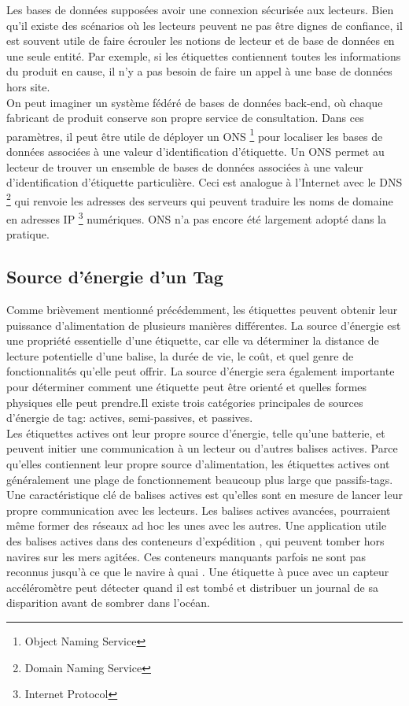 \documentclass[11pt, a4paper, twoside]{book}
\begin{document}
Les bases de données supposées avoir une connexion sécurisée aux lecteurs. Bien qu'il existe des scénarios où les lecteurs peuvent ne pas être dignes de confiance, il est souvent utile de faire écrouler les notions de lecteur et de base de données en une seule entité. Par exemple, si les étiquettes contiennent toutes les informations du produit en cause, il n'y a pas besoin de faire un appel à une base de données hors site.\\

On peut imaginer un système fédéré de bases de données back-end, où chaque fabricant de produit conserve son propre service de consultation. Dans ces paramètres, il peut être utile de déployer un ONS \footnote{Object Naming Service} pour localiser les bases de données associées à une valeur d'identification d'étiquette. Un ONS permet au lecteur de trouver un ensemble de bases de données associées à une valeur d'identification d'étiquette particulière. Ceci est analogue à l'Internet avec le DNS \footnote{Domain Naming Service} qui renvoie les adresses des serveurs qui peuvent traduire les noms de domaine en adresses IP \footnote{Internet Protocol} numériques. ONS n'a pas encore été largement adopté dans la pratique.
\subsection{Source d'énergie d'un Tag}
Comme brièvement mentionné précédemment, les étiquettes peuvent obtenir leur puissance d'alimentation de plusieurs manières différentes. La source d'énergie est une propriété essentielle d'une étiquette, car elle va déterminer la distance de lecture potentielle d'une balise, la durée de vie, le coût, et quel genre de fonctionnalités qu'elle peut offrir. La source d'énergie sera également importante pour déterminer comment une étiquette peut être orienté et quelles formes physiques elle peut prendre.Il existe trois catégories principales de sources d'énergie de tag: actives, semi-passives, et passives.\\

 Les étiquettes actives ont leur propre source d'énergie, telle qu'une batterie, et peuvent initier une communication à un lecteur ou d'autres balises actives. Parce qu'elles contiennent leur propre source d'alimentation, les étiquettes actives ont généralement une plage de fonctionnement beaucoup plus large que passifs-tags. Une caractéristique clé de balises actives est qu'elles sont en mesure de lancer leur propre communication avec les lecteurs. Les balises actives avancées, pourraient même former des réseaux ad hoc les unes avec les autres. Une application utile des balises actives dans des conteneurs d'expédition , qui peuvent tomber hors navires sur les mers agitées. Ces conteneurs manquants parfois ne sont pas reconnus jusqu'à ce que le navire à quai . Une étiquette à puce avec un capteur accéléromètre peut détecter quand il est tombé et distribuer un journal de sa disparition avant de sombrer dans l'océan.\\
\end{document}
